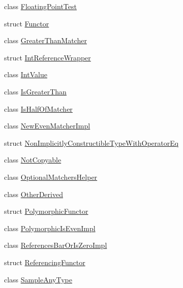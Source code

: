 \begin{DoxyCompactItemize}
\item 
class \mbox{\hyperlink{classtesting_1_1gmock__matchers__test_1_1FloatingPointTest}{Floating\+Point\+Test}}
\item 
struct \mbox{\hyperlink{structtesting_1_1gmock__matchers__test_1_1Functor}{Functor}}
\item 
class \mbox{\hyperlink{classtesting_1_1gmock__matchers__test_1_1GreaterThanMatcher}{Greater\+Than\+Matcher}}
\item 
struct \mbox{\hyperlink{structtesting_1_1gmock__matchers__test_1_1IntReferenceWrapper}{Int\+Reference\+Wrapper}}
\item 
class \mbox{\hyperlink{classtesting_1_1gmock__matchers__test_1_1IntValue}{Int\+Value}}
\item 
class \mbox{\hyperlink{classtesting_1_1gmock__matchers__test_1_1IsGreaterThan}{Is\+Greater\+Than}}
\item 
class \mbox{\hyperlink{classtesting_1_1gmock__matchers__test_1_1IsHalfOfMatcher}{Is\+Half\+Of\+Matcher}}
\item 
class \mbox{\hyperlink{classtesting_1_1gmock__matchers__test_1_1NewEvenMatcherImpl}{New\+Even\+Matcher\+Impl}}
\item 
struct \mbox{\hyperlink{structtesting_1_1gmock__matchers__test_1_1NonImplicitlyConstructibleTypeWithOperatorEq}{Non\+Implicitly\+Constructible\+Type\+With\+Operator\+Eq}}
\item 
class \mbox{\hyperlink{classtesting_1_1gmock__matchers__test_1_1NotCopyable}{Not\+Copyable}}
\item 
class \mbox{\hyperlink{classtesting_1_1gmock__matchers__test_1_1OptionalMatchersHelper}{Optional\+Matchers\+Helper}}
\item 
class \mbox{\hyperlink{classtesting_1_1gmock__matchers__test_1_1OtherDerived}{Other\+Derived}}
\item 
struct \mbox{\hyperlink{structtesting_1_1gmock__matchers__test_1_1PolymorphicFunctor}{Polymorphic\+Functor}}
\item 
class \mbox{\hyperlink{classtesting_1_1gmock__matchers__test_1_1PolymorphicIsEvenImpl}{Polymorphic\+Is\+Even\+Impl}}
\item 
class \mbox{\hyperlink{classtesting_1_1gmock__matchers__test_1_1ReferencesBarOrIsZeroImpl}{References\+Bar\+Or\+Is\+Zero\+Impl}}
\item 
struct \mbox{\hyperlink{structtesting_1_1gmock__matchers__test_1_1ReferencingFunctor}{Referencing\+Functor}}
\item 
class \mbox{\hyperlink{classtesting_1_1gmock__matchers__test_1_1SampleAnyType}{Sample\+Any\+Type}}

\end{DoxyCompactItemize}
